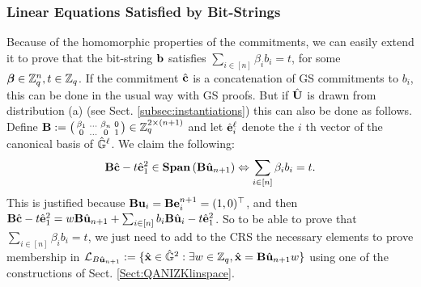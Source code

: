 \subsubsection{Linear Equations Satisfied by Bit-Strings}\label{sec:linear-eqs-bitstrings}
Because of the homomorphic properties of the commitments, 
we can easily extend it to prove that the bit-string $ \mathbf{b}$ satisfies $\sum_{i \in [n]} \beta_i b_i=t$, for some ${\boldsymbol \beta} \in \mathbb{Z}_q^{n}, t\in \mathbb{Z}_q$. 
If the commitment ${\hat{\mathbf{c}}}$ is a concatenation of GS commitments to $b_i$, this can be done in the usual way with GS proofs. 
But if ${\hat{\mathbf{{U}}}}$ is drawn from distribution (a) (see Sect. \ref{subsec:instantiations})
this can also be done as follows. 
Define $\mathbf{{B}}:=\left(\begin{smallmatrix} \beta_1 & \ldots & \beta_n & 0\\ 0 & \ldots & 0 &1\end{smallmatrix}\right)
\in \mathbb{Z}_q^{2\times (n+1)}$ and let ${\hat{\mathbf{e}}}_i^{\ell}$ denote the $i$ th vector of the canonical basis of ${\hat{\mathbb{G}}}^{\ell}$.  
We claim the following:
$$\mathbf{{B}}\hat{\mathbf{c}}- t {\hat{\mathbf{e}}}^{2}_{1} \in \mathbf{Span}\left(\mathbf{{B}}\hat{\mathbf{u}}_{n+1}\right) \Leftrightarrow \sum_{i \in [n]}\beta_i  b_i=t.$$
This is justified because
$\mathbf{{B}}\mathbf{u}_i = \mathbf{{B}}\mathbf{e}^{n+1}_i=(1,0)^{\top}$, and then
$ \mathbf{{B}}\hat{\mathbf{c}}- t {\hat{\mathbf{e}}}^{2}_{1}=w  \mathbf{{B}} \hat{\mathbf{u}}_{n+1}+ \sum_{i \in [n]} b_i \mathbf{{B}} \hat{\mathbf{u}}_{i} - t {\hat{\mathbf{e}}}^{2}_1$.
So to be able to prove that $\sum_{i \in [n]} \beta_i b_i=t$, we just need to add to the CRS the necessary elements to prove membership 
in $\mathcal{L}_{B\hat{\mathbf{u}}_{n+1}}:=\{ {\hat{\mathbf{x}}} \in {\ensuremath{\hat{\mathbb{G}}}}^2: \exists w \in \mathbb{Z}_q,  {\hat{\mathbf{x}}} = \mathbf{{B}}\hat{\mathbf{u}}_{n+1} w\}$ using one of the constructions of Sect. 
\ref{Sect:QANIZKlinspace}.
